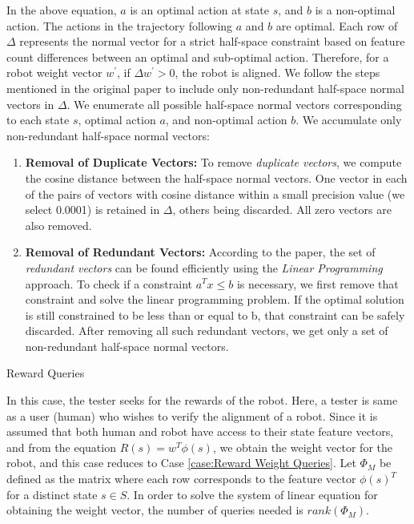 In the above equation, $a$ is an optimal action at state $s$, and $b$ is a non-optimal action. The actions in the trajectory following $a$ and $b$ are optimal. Each row of $\Delta$ represents the normal vector for a strict half-space constraint based on feature count differences between an optimal and sub-optimal action. Therefore, for a robot weight vector $w^{'}$, if $\Delta w^{'} > 0$, the robot is aligned. We follow the steps mentioned in the original paper to include only non-redundant half-space normal vectors in $\Delta$. We enumerate all possible half-space normal vectors corresponding to each state $s$, optimal action $a$, and non-optimal action $b$. We accumulate only non-redundant half-space normal vectors:
\begin{enumerate}
    \item \textbf{Removal of Duplicate Vectors:} To remove \textit{duplicate vectors}, we compute the cosine distance between the half-space normal vectors. One vector in each of the pairs of vectors with cosine distance within a small precision value (we select 0.0001) is retained in $\Delta$, others being discarded. All zero vectors are also removed.
    \item \textbf{Removal of Redundant Vectors:} According to the paper, the set of \textit{redundant vectors} can be found efficiently using the \textit{Linear Programming} approach. To check if a constraint $a^Tx \leq b$ is necessary, we first remove that constraint and solve the linear programming problem. If the optimal solution is still constrained to be less than or equal to b, that constraint can be safely discarded. After removing all such redundant vectors, we get only a set of non-redundant half-space normal vectors.
\end{enumerate}
\begin{case}
\label{case:Reward Queries}
Reward Queries
\end{case}

In this case, the tester seeks for the rewards of the robot. Here, a tester is same as a user (human) who wishes to verify the alignment of a robot. Since it is assumed that both human and robot have access to their state feature vectors, and from the equation $R(s) = w^T \phi (s)$, we obtain the weight vector for the robot, and this case reduces to Case \ref{case:Reward Weight Queries}. Let $\Phi_{M}$ be defined as the matrix where each row corresponds to the feature vector $\phi(s)^{T}$ for a distinct state $s \in S$. In order to solve the system of linear equation for obtaining the weight vector, the number of queries needed is $rank(\Phi_{M})$.

